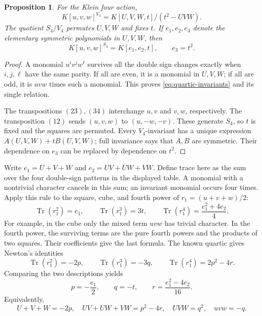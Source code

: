 \documentclass[11pt]{article}
\newtheorem{proposition}{Proposition}[section]
\theoremstyle{remark}
\begin{document}
\begin{proposition}
For the Klein four action,
\begin{equation}
K[u,v,w]^{V_4}=K[U,V,W,t]/(t^2-UVW).
\label{eq:quartic-invariants}
\end{equation}
The quotient \(S_4/V_4\) permutes \(U,V,W\) and fixes \(t\). If \(e_1,e_2,e_3\) denote the elementary symmetric polynomials in \(U,V,W\), then
\begin{equation}
K[u,v,w]^{S_4}=K[e_1,e_2,t],\qquad e_3=t^2.
\label{eq:quartic-full-invariants}
\end{equation}
\end{proposition}

\begin{proof}
A monomial \(u^iv^jw^\ell\) survives all the double sign changes exactly when \(i,j,\ell\) have the same parity. If all are even, it is a monomial in \(U,V,W\); if all are odd, it is \(uvw\) times such a monomial. This proves \eqref{eq:quartic-invariants} and its single relation.

The transpositions \((23),(34)\) interchange \(u,v\) and \(v,w\), respectively. The transposition \((12)\) sends \((u,v,w)\) to \((u,-w,-v)\). These generate \(S_4\), so \(t\) is fixed and the squares are permuted. Every \(V_4\)-invariant has a unique expression \(A(U,V,W)+tB(U,V,W)\); full invariance says that \(A,B\) are symmetric. Their dependence on \(e_3\) can be replaced by dependence on \(t^2\).
\end{proof}

Write \(e_1=U+V+W\) and \(e_2=UV+UW+VW\). Define trace here as the sum over the four double-sign patterns in the displayed table. A monomial with a nontrivial character cancels in this sum; an invariant monomial occurs four times. Apply this rule to the square, cube, and fourth power of \(r_1=(u+v+w)/2\):
\[
\operatorname{Tr}(r_1^2)=e_1,\qquad
\operatorname{Tr}(r_1^3)=3t,\qquad
\operatorname{Tr}(r_1^4)=\frac{e_1^2+4e_2}{4}.
\]
For example, in the cube only the mixed term \(uvw\) has trivial character. In the fourth power, the surviving terms are the pure fourth powers and the products of two squares. Their coefficients give the last formula. The known quartic gives Newton's identities
\[
\operatorname{Tr}(r_1^2)=-2p,\qquad
\operatorname{Tr}(r_1^3)=-3q,\qquad
\operatorname{Tr}(r_1^4)=2p^2-4r.
\]
Comparing the two descriptions yields
\begin{equation}
p=-\frac{e_1}{2},\qquad q=-t,\qquad
r=\frac{e_1^2-4e_2}{16}.
\label{eq:quartic-coefficients}
\end{equation}
Equivalently,
\begin{equation}
U+V+W=-2p,\quad UV+UW+VW=p^2-4r,\quad UVW=q^2,
\quad uvw=-q.
\label{eq:quartic-constraints}
\end{equation}
\end{document}
